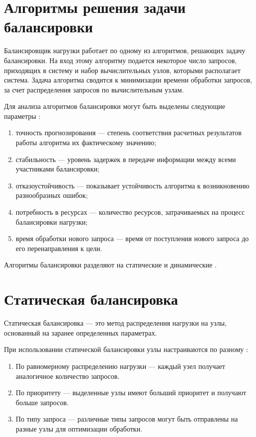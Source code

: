 \section{Алгоритмы решения задачи балансировки}
Балансировщик нагрузки работает по одному из алгоритмов, решающих задачу балансировки.
На вход этому алгоритму подается некоторое число запросов, приходящих в систему и набор вычислительных узлов, которыми
располагает система.
Задача алгоритма сводится к минимизации времени обработки запросов, за счет распределения запросов по вычислительным
узлам.

Для анализа алгоритмов балансировки могут быть выделены следующие параметры \cite{uzel}:

\begin{enumerate}[label=---]
	\item точность прогнозирования --- степень соответствия расчетных результатов работы алгоритма их фактическому значению;
	\item стабильность --- уровень задержек в передаче информации между всеми участниками балансировки;
	\item отказоустойчивость --- показывает устойчивость алгоритма к возникновению разнообразных ошибок;
	\item потребность в ресурсах --- количество ресурсов, затрачиваемых на процесс балансировки нагрузки;
	\item время обработки нового запроса --- время от поступления нового запроса до его перенаправления к цели.
\end{enumerate}

Алгоритмы балансировки разделяют на статические и динамические \cite{uzel}.

\section{Статическая балансировка}
Статическая балансировка --- это метод распределения нагрузки на узлы, основанный на заранее определенных параметрах.
\begin{comment}
Основная цель статической балансировки состоит в том, чтобы равномерно распределить трафик между несколькими узлами, чтобы каждый узел получал приблизительно одинаковое количество нагрузки.
\end{comment}

При использовании статической балансировки узлы настраиваются по разному \cite{mainsource}:
\begin{enumerate}[label=---]
	\item По равномерному распределению нагрузки --- каждый узел получает аналогичное количество запросов.
	\item По приоритету --- выделенные узлы имеют больший приоритет и получают больше запросов.
	\item По типу запроса --- различные типы запросов могут быть отправлены на разные узлы для оптимизации обработки.
\end{enumerate}


